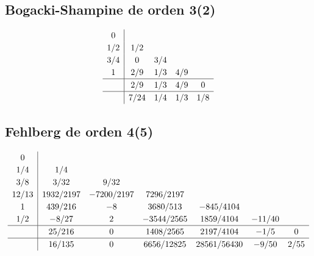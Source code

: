     \subsection{Bogacki-Shampine de orden 3(2)}
    \vspace{-10pt}
        \begin{equation}\label{eq:bogasham23}
            \renewcommand\arraystretch{1.2}
            \begin{array}{c|cccc}
            0\\
            1/2 & 1/2\\
            3/4 & 0 & 3/4\\
            1 & 2/9 & 1/3 & 4/9\\
            \hline
            & 2/9 & 1/3 & 4/9 & 0 \\
            \hline
            & 7/24 & 1/4 & 1/3 & 1/8
            \end{array}
        \end{equation}
    
    \vfill
    
    \subsection{Fehlberg  de orden 4(5)}
        \vspace{-10pt}
            \begin{equation}\label{eq:fehlberg45}
                \renewcommand\arraystretch{1.2}
                \begin{array}{c|cccccc}
                0\\
                1/4 & 1/4\\
                3/8 & 3/32 & 9/32\\
                12/13 & 1932/2197 & -7200/2197 & 7296/2197\\
                1 & 439/216 & -8 & 3680/513 & -845/4104\\
                1/2 & -8/27 & 2 & -3544/2565 & 1859/4104 & -11/40\\
                \hline
                & 25/216 & 0 & 1408/2565 & 2197/4104 & -1/5 & 0\\
                \hline
                & 16/135 & 0 & 6656/12825 & 28561/56430 & -9/50 & 2/55
                \end{array}
            \end{equation}
    
    \vfill
    
    \pagebreak

